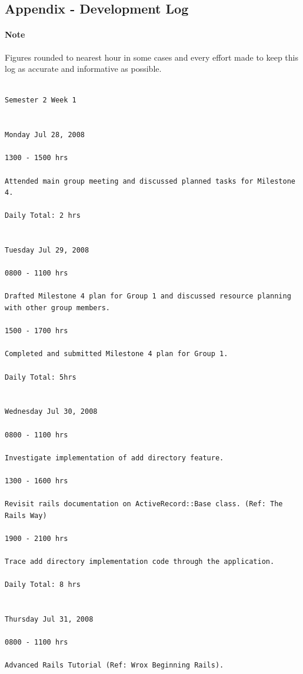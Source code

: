 \documentclass[10pt,a4,oneside]{article}
\begin{document}
\paragraph{}


\newpage

\subsection*{Appendix - Development Log}

\paragraph{Note}
Figures rounded to nearest hour in some cases and every effort made 
to keep this log as accurate and informative as possible.

\begin{mylisting}
\begin{verbatim}

Semester 2 Week 1


Monday Jul 28, 2008

1300 - 1500 hrs

Attended main group meeting and discussed planned tasks for Milestone 4.

Daily Total: 2 hrs


Tuesday Jul 29, 2008

0800 - 1100 hrs

Drafted Milestone 4 plan for Group 1 and discussed resource planning with other group members.

1500 - 1700 hrs

Completed and submitted Milestone 4 plan for Group 1.

Daily Total: 5hrs


Wednesday Jul 30, 2008

0800 - 1100 hrs

Investigate implementation of add directory feature.

1300 - 1600 hrs

Revisit rails documentation on ActiveRecord::Base class. (Ref: The Rails Way)

1900 - 2100 hrs

Trace add directory implementation code through the application.

Daily Total: 8 hrs


Thursday Jul 31, 2008

0800 - 1100 hrs

Advanced Rails Tutorial (Ref: Wrox Beginning Rails).


\end{verbatim}
\end{mylisting}
\end{document}

